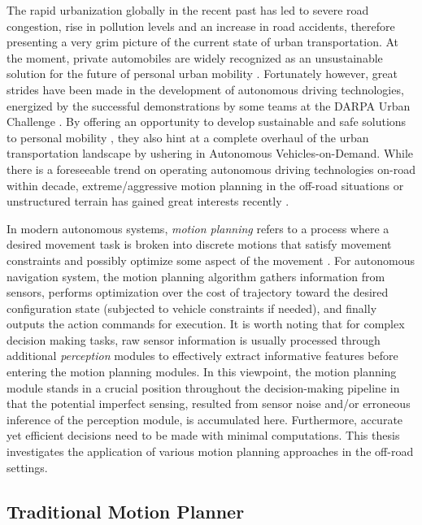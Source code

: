 \documentclass[../thesis.tex]{subfiles}
\begin{document}
The rapid urbanization globally in the recent past has led to severe road congestion, rise in pollution levels and an increase in road accidents, therefore presenting a very grim picture of the current state of urban transportation. 
At the moment, private automobiles are widely recognized as an unsustainable solution for the future of personal urban mobility \cite{reinventing}. 
Fortunately however, great strides have been made in the development of autonomous driving technologies, energized by the successful demonstrations by some teams at the DARPA Urban Challenge \cite{boss, multimodaltartan}. 
By offering an opportunity to develop sustainable and safe solutions to personal mobility \cite{usecases_of_AD}, they also hint at a complete overhaul of the urban transportation landscape by ushering in Autonomous Vehicles-on-Demand. 
While there is a foreseeable trend on operating autonomous driving technologies on-road within decade, extreme/aggressive motion planning in the off-road situations or unstructured terrain has gained great interests recently \cite{kolter2010probabilistic,williams2016aggressive,gray2012predictive,cutler2016autonomous,cutler2014reinforcement}. 
 
In modern autonomous systems, \textit{motion planning} refers to a process where a desired movement task is broken into discrete motions that satisfy movement constraints and possibly optimize some aspect of the movement \cite{wiki:motion-planning}. 
For autonomous navigation system, the motion planning algorithm gathers information from sensors, performs optimization over the cost of trajectory toward the desired configuration state (subjected to vehicle constraints if needed), and finally outputs the action commands for execution. 
It is worth noting that for complex decision making tasks, raw sensor information is usually processed through additional \textit{perception} modules to effectively extract informative features before entering the motion planning modules.
In this viewpoint, the motion planning module stands in a crucial position throughout the decision-making pipeline in that the potential imperfect sensing, resulted from sensor noise and/or erroneous inference of the perception module, is accumulated here. 
Furthermore, accurate yet efficient decisions need to be made with minimal computations.
This thesis investigates the application of various motion planning approaches in the off-road settings.
 
\subsection{Traditional Motion Planner}
 
\end{document}
